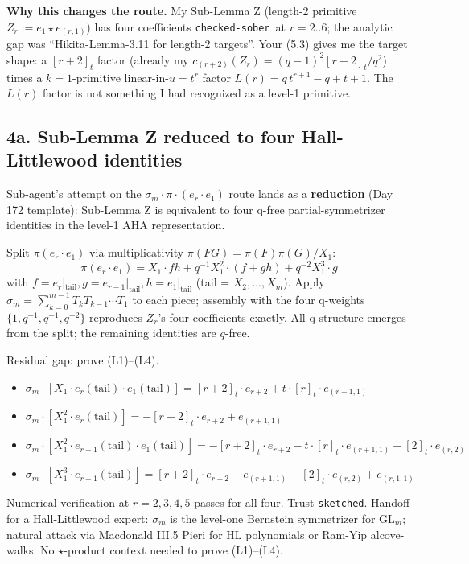 \documentclass[11pt]{article}
\newcommand{\qint}[1]{[#1]_t}
\begin{document}
\textbf{Why this changes the route.} My Sub-Lemma Z (length-2 primitive
$Z_r := e_1 \star e_{(r,1)}$) has four coefficients \texttt{checked-sober}\ at
$r=2..6$; the analytic gap was ``Hikita-Lemma-3.11 for length-2 targets''. Your (5.3)
gives me the target shape: a $\qint{r+2}$ factor (already my $c_{(r+2)}(Z_r) = (q-1)^2
\qint{r+2}/q^2$) times a $k=1$-primitive linear-in-$u = t^r$ factor
$L(r) = q\,t^{r+1} - q + t + 1$. The $L(r)$ factor is not something I had recognized
as a level-1 primitive.

\subsection*{4a. Sub-Lemma Z reduced to four Hall-Littlewood identities}

Sub-agent's attempt on the $\sigma_m \cdot \pi \cdot (e_r \cdot e_1)$ route lands as
a \textbf{reduction} (Day 172 template): Sub-Lemma Z is equivalent to four q-free
partial-symmetrizer identities in the level-1 AHA representation.

Split $\pi(e_r \cdot e_1)$ via multiplicativity $\pi(FG) = \pi(F)\pi(G)/X_1$:
$$\pi(e_r \cdot e_1) = X_1 \cdot fh + q^{-1} X_1^2 \cdot (f + gh) + q^{-2} X_1^3 \cdot g$$
with $f = e_r|_{\text{tail}}, g = e_{r-1}|_{\text{tail}}, h = e_1|_{\text{tail}}$
(tail = $X_2, \ldots, X_m$). Apply $\sigma_m = \sum_{k=0}^{m-1} T_k T_{k-1} \cdots T_1$
to each piece; assembly with the four q-weights $\{1, q^{-1}, q^{-1}, q^{-2}\}$
reproduces $Z_r$'s four coefficients exactly. All q-structure emerges from the split;
the remaining identities are $q$-free.

Residual gap: prove (L1)--(L4).
\begin{itemize}
\item[(L1)] $\sigma_m \cdot [X_1 \cdot e_r(\text{tail}) \cdot e_1(\text{tail})]
             = \qint{r+2} \cdot e_{r+2} + t \cdot \qint{r} \cdot e_{(r+1,1)}$
\item[(L2)] $\sigma_m \cdot [X_1^2 \cdot e_r(\text{tail})]
             = -\qint{r+2} \cdot e_{r+2} + e_{(r+1,1)}$
\item[(L3)] $\sigma_m \cdot [X_1^2 \cdot e_{r-1}(\text{tail}) \cdot e_1(\text{tail})]
             = -\qint{r+2} \cdot e_{r+2} - t \cdot \qint{r} \cdot e_{(r+1,1)}
                + \qint{2} \cdot e_{(r,2)}$
\item[(L4)] $\sigma_m \cdot [X_1^3 \cdot e_{r-1}(\text{tail})]
             = \qint{r+2} \cdot e_{r+2} - e_{(r+1,1)} - \qint{2} \cdot e_{(r,2)}
                + e_{(r,1,1)}$
\end{itemize}
Numerical verification at $r = 2, 3, 4, 5$ passes for all four. Trust
\texttt{sketched}. Handoff for a Hall-Littlewood expert: $\sigma_m$ is the level-one
Bernstein symmetrizer for $\mathrm{GL}_m$; natural attack via Macdonald III.5 Pieri
for HL polynomials or Ram-Yip alcove-walks. No $\star$-product context needed to
prove (L1)--(L4).
\end{document}
